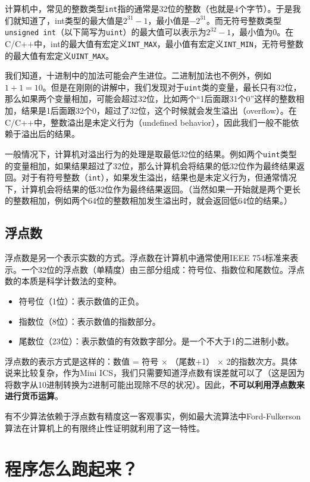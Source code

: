 \documentclass[../main.tex]{subfiles}
\begin{document}
计算机中，常见的整数类型\texttt{int}指的通常是32位的整数（也就是4个字节）。于是我们就知道了，int类型的最大值是$2^{31}-1$，最小值是$-2^{31}$。而无符号整数类型\texttt{unsigned int}（以下简写为\texttt{uint}）的最大值可以表示为$2^{32}-1$，最小值为0。在C/C++中，int的最大值有宏定义\texttt{INT\_MAX}，最小值有宏定义\texttt{INT\_MIN}，无符号整数的最大值有宏定义\texttt{UINT\_MAX}。

我们知道，十进制中的加法可能会产生进位。二进制加法也不例外，例如$1+1=10$。但是在刚刚的讲解中，我们发现对于\texttt{uint}类的变量，最长只有32位，那么如果两个变量相加，可能会超过32位，比如两个“1后面跟31个0”这样的整数相加，结果是1后面跟32个0，超过了32位，这个时候就会发生溢出（overflow）。在C/C++中，整数溢出是未定义行为（undefined behavior），因此我们一般不能依赖于溢出后的结果。

一般情况下，计算机对溢出行为的处理是取最低32位的结果。例如两个\texttt{uint}类型的变量相加，如果结果超过了32位，那么计算机会将结果的低32位作为最终结果返回。对于有符号整数（\texttt{int}），如果发生溢出，结果也是未定义行为，但通常情况下，计算机会将结果的低32位作为最终结果返回。（当然如果一开始就是两个更长的整数相加，例如两个64位的整数相加发生溢出时，就会返回低64位的结果。）

\subsection{浮点数}

浮点数是另一个表示实数的方式。浮点数在计算机中通常使用IEEE 754标准来表示。一个32位的浮点数（单精度）由三部分组成：符号位、指数位和尾数位。浮点数的本质是科学计数法的变种。
\begin{itemize}
    \item 符号位（1位）：表示数值的正负。
    \item 指数位（8位）：表示数值的指数部分。
    \item 尾数位（23位）：表示数值的有效数字部分。是一个不大于1的二进制小数。
\end{itemize}

浮点数的表示方式是这样的：数值 = 符号 $\times$ （尾数+1） $\times$ 2的指数次方。具体说来比较复杂，作为Mini ICS，我们只需要知道浮点数有误差就可以了（这是因为将数字从10进制转换为2进制可能出现除不尽的状况）。因此，\textbf{不可以利用浮点数来进行货币运算}。

有不少算法依赖于浮点数有精度这一客观事实，例如最大流算法中Ford-Fulkerson算法在计算机上的有限终止性证明就利用了这一特性。

\section{程序怎么跑起来？}
\end{document}

